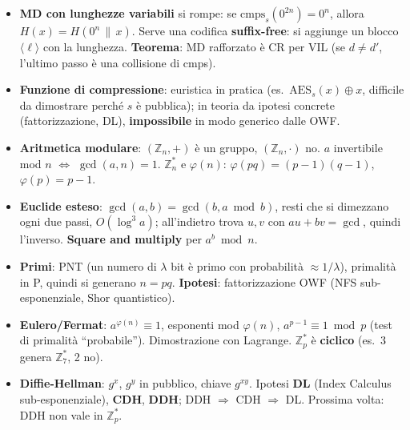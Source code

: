 \begin{itemize}
  \item \textbf{MD con lunghezze variabili} si rompe: se \(\text{cmps}_s(0^{2n}) = 0^n\), allora \(H(x) = H(0^n \,\|\, x)\). Serve una codifica \textbf{suffix-free}: si aggiunge un blocco \(\langle \ell \rangle\) con la lunghezza. \textbf{Teorema}: MD rafforzato è CR per VIL (se \(d \ne d'\), l'ultimo passo è una collisione di cmps).
  \item \textbf{Funzione di compressione}: euristica in pratica (es.\ \(\text{AES}_s(x) \oplus x\), difficile da dimostrare perché \(s\) è pubblica); in teoria da ipotesi concrete (fattorizzazione, DL), \textbf{impossibile} in modo generico dalle OWF.
  \item \textbf{Aritmetica modulare}: \((\mathbb{Z}_n, +)\) è un gruppo, \((\mathbb{Z}_n, \cdot)\) no. \(a\) invertibile mod \(n\) \(\Leftrightarrow\) \(\gcd(a, n) = 1\). \(\mathbb{Z}_n^*\) e \(\varphi(n)\): \(\varphi(pq) = (p-1)(q-1)\), \(\varphi(p) = p - 1\).
  \item \textbf{Euclide esteso}: \(\gcd(a, b) = \gcd(b, a \bmod b)\), resti che si dimezzano ogni due passi, \(O(\log^3 a)\); all'indietro trova \(u, v\) con \(au + bv = \gcd\), quindi l'inverso. \textbf{Square and multiply} per \(a^b \bmod n\).
  \item \textbf{Primi}: PNT (un numero di \(\lambda\) bit è primo con probabilità \(\approx 1/\lambda\)), primalità in P, quindi si generano \(n = pq\). \textbf{Ipotesi}: fattorizzazione OWF (NFS sub-esponenziale, Shor quantistico).
  \item \textbf{Eulero/Fermat}: \(a^{\varphi(n)} \equiv 1\), esponenti mod \(\varphi(n)\), \(a^{p-1} \equiv 1 \bmod p\) (test di primalità ``probabile''). Dimostrazione con Lagrange. \(\mathbb{Z}_p^*\) è \textbf{ciclico} (es.\ 3 genera \(\mathbb{Z}_7^*\), 2 no).
  \item \textbf{Diffie-Hellman}: \(g^x\), \(g^y\) in pubblico, chiave \(g^{xy}\). Ipotesi \textbf{DL} (Index Calculus sub-esponenziale), \textbf{CDH}, \textbf{DDH}; DDH \(\Rightarrow\) CDH \(\Rightarrow\) DL. Prossima volta: DDH non vale in \(\mathbb{Z}_p^*\).
\end{itemize}
